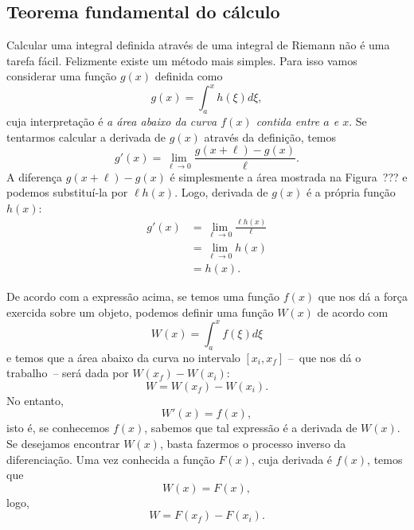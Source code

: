 \subsection{Teorema fundamental do cálculo}

Calcular uma integral definida através de uma integral de Riemann não é uma tarefa fácil. Felizmente existe um método mais simples. Para isso vamos considerar uma função $g(x)$ definida como
\begin{equation}
  g(x) = \int_a^x h(\xi) d\xi,
\end{equation}
%
cuja interpretação é \emph{a área abaixo da curva $f(x)$ contida entre $a$ e $x$}. 
Se tentarmos calcular a derivada de $g(x)$ através da definição, temos
\begin{equation}
  g'(x) = \lim_{\ell \to 0} \frac{g(x+\ell) - g(x)}{\ell}.
\end{equation}
%
A diferença $g(x+\ell) - g(x)$ é simplesmente a área mostrada na Figura~??? e podemos substituí-la por $\ell h(x)$. Logo, derivada de $g(x)$ é a própria função $h(x)$:
\begin{align}
  g'(x) &= \lim_{\ell \to 0} \frac{\ell h(x)}{\ell} \\
  &= \lim_{\ell \to 0} h(x) \\
  &= h(x).
\end{align}

De acordo com a expressão acima, se temos uma função $f(x)$ que nos dá a força exercida sobre um objeto, podemos definir uma função $W(x)$ de acordo com
\begin{equation}
  W(x) = \int_a^x f(\xi) d\xi
\end{equation}
%
e temos que a área abaixo da curva no intervalo $[x_i,x_f]$ --~que nos dá o trabalho~-- será dada por $W(x_f) - W(x_i)$:
\begin{equation}
  W = W(x_f) - W(x_i).
\end{equation}
%
No entanto,
\begin{equation}
  W'(x) = f(x),
\end{equation}
%
isto é, se conhecemos $f(x)$, sabemos que tal expressão é a derivada de $W(x)$. Se desejamos encontrar $W(x)$, basta fazermos o processo inverso da diferenciação. Uma vez conhecida a função $F(x)$, cuja derivada é $f(x)$, temos que
\begin{equation}
  W(x) = F(x),
\end{equation}
%
logo,
\begin{equation}
  W = F(x_f) - F(x_i).
\end{equation}

